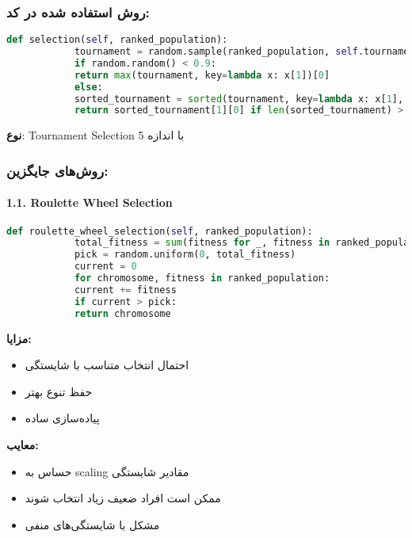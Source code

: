 \documentclass[12pt,a4paper]{article}
\newenvironment{ltrcode}{\lr\bgroup}{\egroup}
\begin{document}
	\subsubsection{روش استفاده شده در کد:}
	
	\begin{ltrcode}
		\begin{lstlisting}[language=Python, caption=Tournament Selection]
			def selection(self, ranked_population):
			tournament = random.sample(ranked_population, self.tournament_size)
			if random.random() < 0.9:
			return max(tournament, key=lambda x: x[1])[0]
			else:
			sorted_tournament = sorted(tournament, key=lambda x: x[1], reverse=True)
			return sorted_tournament[1][0] if len(sorted_tournament) > 1 else sorted_tournament[0][0]
		\end{lstlisting}
	\end{ltrcode}
	
	\textbf{نوع}: Tournament Selection با اندازه 5
	
	\subsubsection{روش‌های جایگزین:}
	
	\paragraph{1.1. Roulette Wheel Selection}
	
	\begin{ltrcode}
		\begin{lstlisting}[language=Python, caption=Roulette Wheel Selection]
			def roulette_wheel_selection(self, ranked_population):
			total_fitness = sum(fitness for _, fitness in ranked_population)
			pick = random.uniform(0, total_fitness)
			current = 0
			for chromosome, fitness in ranked_population:
			current += fitness
			if current > pick:
			return chromosome
		\end{lstlisting}
	\end{ltrcode}
	
	\textbf{مزایا:}
	\begin{itemize}
		\item احتمال انتخاب متناسب با شایستگی
		\item حفظ تنوع بهتر
		\item پیاده‌سازی ساده
	\end{itemize}
	
	\textbf{معایب:}
	\begin{itemize}
		\item حساس به scaling مقادیر شایستگی
		\item ممکن است افراد ضعیف زیاد انتخاب شوند
		\item مشکل با شایستگی‌های منفی
	\end{itemize}
	
\end{document}
